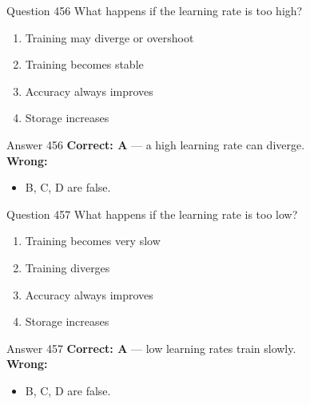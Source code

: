 \documentclass[aspectratio=169,11pt]{beamer}
\begin{document}
	\begin{frame}{Question 456}
		What happens if the learning rate is too high?
		\begin{enumerate}[label=\Alph*.]
			\item Training may diverge or overshoot
			\item Training becomes stable
			\item Accuracy always improves
			\item Storage increases
		\end{enumerate}
	\end{frame}
	\begin{frame}{Answer 456}
		\textbf{Correct: A} --- a high learning rate can diverge.\\
		\vspace{0.5em}
		\textbf{Wrong:}
		\begin{itemize}
			\item B, C, D are false.
		\end{itemize}
	\end{frame}
	
	\begin{frame}{Question 457}
		What happens if the learning rate is too low?
		\begin{enumerate}[label=\Alph*.]
			\item Training becomes very slow
			\item Training diverges
			\item Accuracy always improves
			\item Storage increases
		\end{enumerate}
	\end{frame}
	\begin{frame}{Answer 457}
		\textbf{Correct: A} --- low learning rates train slowly.\\
		\vspace{0.5em}
		\textbf{Wrong:}
		\begin{itemize}
			\item B, C, D are false.
		\end{itemize}
	\end{frame}
	
\end{document}
